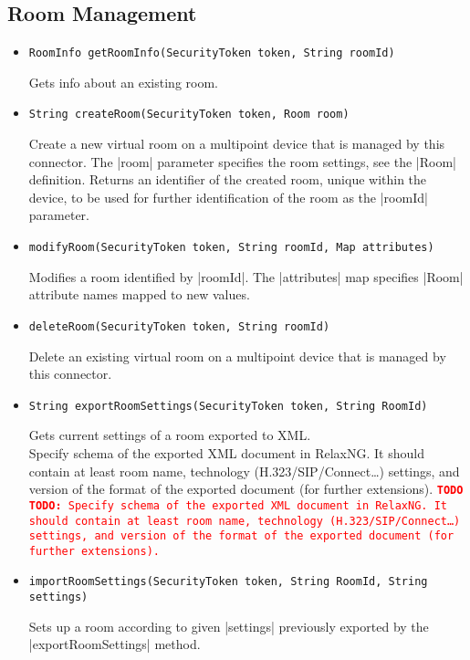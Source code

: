 \documentclass[a4paper]{report}
\newenvironment{Api}{\begin{itemize}}{\end{itemize}}
\newcommand{\ApiCode}[1]{\lstinline[style=styleApi]|#1|}
\newcommand{\ApiItem}[1]{\item #1 %

}
\newcommand{\ApiCmd}[1]{\ApiItem{\ApiCode{#1}}}
\newcommand{\TODO}[1]{%
\def\empty{}%
\def\prvniparametr{#1}%
\ifx\prvniparametr\empty%
\begingroup\tt\textcolor{red}{\noindent\textbf{TODO}}\endgroup
\else%
\begingroup\tt\textcolor{red}{\noindent\textbf{TODO:}\ #1}\endgroup
\fi%
}
\begin{document}
\subsection{Room Management}
\begin{Api}

\ApiCmd{RoomInfo getRoomInfo(SecurityToken token, String roomId)}
Gets info about an existing room.

\ApiCmd{String createRoom(SecurityToken token, Room room)}
Create a new virtual room on a multipoint device that is managed by this connector. The |room| parameter specifies the room settings, see the |Room| definition. Returns an identifier of the created room, unique within the device, to be used for further identification of the room as the |roomId| parameter.

\ApiCmd{modifyRoom(SecurityToken token, String roomId, Map attributes)}
Modifies a room identified by |roomId|. The |attributes| map specifies |Room| attribute names mapped to new values.

\ApiCmd{deleteRoom(SecurityToken token, String roomId)}
Delete an existing virtual room on a multipoint device that is managed by this connector.

\ApiCmd{String exportRoomSettings(SecurityToken token, String RoomId)}
Gets current settings of a room exported to XML.
\\\TODO{Specify schema of the exported XML document in RelaxNG. It should contain at least room name, technology (H.323/SIP/Connect\ldots) settings, and version of the format of the exported document (for further extensions).}

\ApiCmd{importRoomSettings(SecurityToken token, String RoomId, String settings)}
Sets up a room according to given |settings| previously exported by the |exportRoomSettings| method.

\end{Api}
\end{document}

